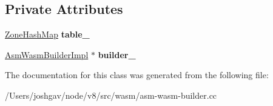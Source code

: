 \subsection*{Private Attributes}
\begin{DoxyCompactItemize}
\item 
\hyperlink{classv8_1_1internal_1_1_template_hash_map_impl}{Zone\+Hash\+Map} {\bfseries table\+\_\+}\hypertarget{classv8_1_1internal_1_1wasm_1_1_asm_wasm_builder_impl_1_1_imported_function_table_a3933b87ea00e5d3e412b8b4515190ede}{}\label{classv8_1_1internal_1_1wasm_1_1_asm_wasm_builder_impl_1_1_imported_function_table_a3933b87ea00e5d3e412b8b4515190ede}

\item 
\hyperlink{classv8_1_1internal_1_1wasm_1_1_asm_wasm_builder_impl}{Asm\+Wasm\+Builder\+Impl} $\ast$ {\bfseries builder\+\_\+}\hypertarget{classv8_1_1internal_1_1wasm_1_1_asm_wasm_builder_impl_1_1_imported_function_table_afdfb1beb571e409ccc90a6a5b8a32dd1}{}\label{classv8_1_1internal_1_1wasm_1_1_asm_wasm_builder_impl_1_1_imported_function_table_afdfb1beb571e409ccc90a6a5b8a32dd1}

\end{DoxyCompactItemize}


The documentation for this class was generated from the following file\+:\begin{DoxyCompactItemize}
\item 
/\+Users/joshgav/node/v8/src/wasm/asm-\/wasm-\/builder.\+cc\end{DoxyCompactItemize}
